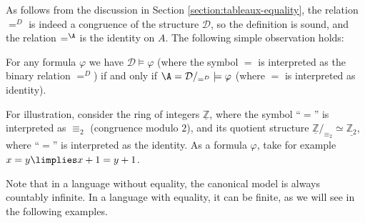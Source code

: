 As follows from the discussion in Section \ref{section:tableaux-equality}, the relation $=^D$ is indeed a congruence of the structure $\mathcal D$, so the definition is sound, and the relation $=^\A$ is the identity on $A$. The following simple observation holds:

\begin{observation}\label{canonical-with-equality-satisfies-the-same}
    For any formula $\varphi$ we have $\mathcal D\models\varphi$ (where the symbol $=$ is interpreted as the binary relation $=^D$) if and only if $\A=\mathcal D/_{=^D}\models\varphi$ (where $=$ is interpreted as identity).    
\end{observation}

\begin{example}
For illustration, consider the ring of integers $\underline{\mathbb Z}$, where the symbol ``$=$'' is interpreted as $\equiv_2$ (congruence modulo $2$), and its quotient structure $\underline{\mathbb Z}/_{\equiv_2} \simeq \underline{\mathbb Z_2}$, where ``$=$'' is interpreted as the identity. As a formula $\varphi$, take for example $x = y \limplies x + 1 = y + 1$.
\end{example}

Note that in a language without equality, the canonical model is always countably infinite. In a language with equality, it can be finite, as we will see in the following examples.

